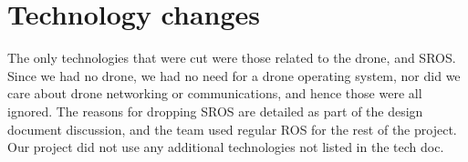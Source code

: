 \documentclass[IEEEtran,letterpaper,10pt,notitlepage,draftclsnofoot,onecolumn]{article}
\begin{document}
\section{Technology changes}
The only technologies that were cut were those related to the drone, and SROS.
Since we had no drone, we had no need for a drone operating system, nor did 
we care about drone networking or communications, and hence those were all 
ignored. The reasons for dropping SROS are detailed as part of the design 
document discussion, and the team used regular ROS for the rest of the project. 
Our project did not use any additional technologies not listed in the tech doc.
\end{document}
